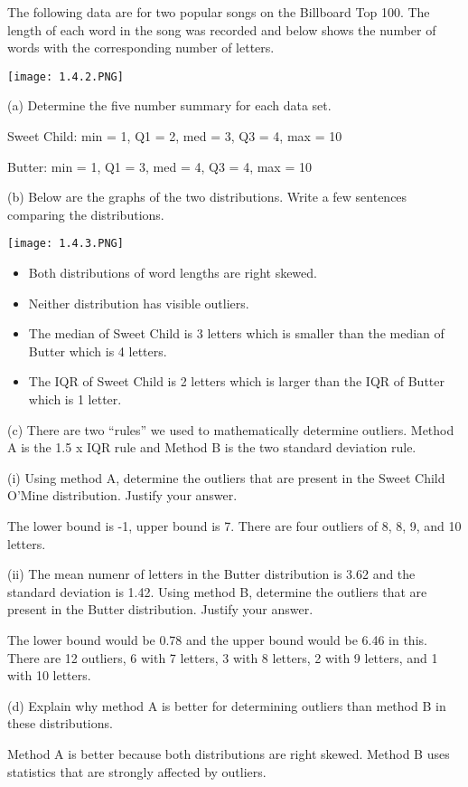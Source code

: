 \documentclass[../stats.tex]{subfiles}
\begin{document}
\begin{example}
    The following data are for two popular songs on the Billboard Top 100. The length of each word in the song was recorded and below shows the number of words with the corresponding number of letters.
    \begin{center}
        \texttt{[image: 1.4.2.PNG]}
    \end{center}
    (a) Determine the five number summary for each data set.

    Sweet Child: min = 1, Q1 = 2, med = 3, Q3 = 4, max = 10 

    Butter: min = 1, Q1 = 3, med = 4, Q3 = 4, max = 10

    (b) Below are the graphs of the two distributions. Write a few sentences comparing the distributions.
    \begin{center}
        \texttt{[image: 1.4.3.PNG]}
    \end{center}
    \begin{itemize}
        \item Both distributions of word lengths are right skewed.
        \item Neither distribution has visible outliers.
        \item The median of Sweet Child is 3 letters which is smaller than the median of Butter which is 4 letters.
        \item The IQR of Sweet Child is 2 letters which is larger than the IQR of Butter which is 1 letter.
    \end{itemize}

    (c) There are two ``rules'' we used to mathematically determine outliers. Method A is the 1.5 x IQR rule and Method B is the two standard deviation rule.
    
    (i) Using method A, determine the outliers that are present in the Sweet Child O'Mine distribution. Justify your answer.

    The lower bound is -1, upper bound is 7. There are four outliers of 8, 8, 9, and 10 letters.

    (ii) The mean numenr of letters in the Butter distribution is 3.62 and the standard deviation is 1.42. Using method B, determine the outliers that are present in the Butter distribution. Justify your answer.

    The lower bound would be 0.78 and the upper bound would be 6.46 in this. There are 12 outliers, 6 with 7 letters, 3 with 8 letters, 2 with 9 letters, and 1 with 10 letters.

    (d) Explain why method A is better for determining outliers than method B in these distributions.

    Method A is better because both distributions are right skewed. Method B uses statistics that are strongly affected by outliers.
\end{example}
\end{document}
